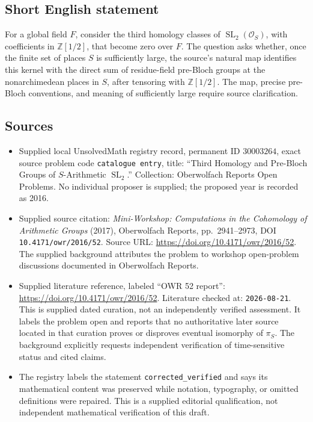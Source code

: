 \documentclass[11pt]{article}
\newcommand{\Z}{\mathbb{Z}}
\begin{document}
\subsection{Short English statement}
For a global field \(F\), consider the third homology classes of \(\operatorname{SL}_2(\mathcal O_S)\), with coefficients in \(\Z[1/2]\), that become zero over \(F\). The question asks whether, once the finite set of places \(S\) is sufficiently large, the source's natural map identifies this kernel with the direct sum of residue-field pre-Bloch groups at the nonarchimedean places in \(S\), after tensoring with \(\Z[1/2]\). The map, precise pre-Bloch conventions, and meaning of sufficiently large require source clarification.
\subsection{Sources}
\begin{itemize}
\item Supplied local UnsolvedMath registry record, permanent ID \(30003264\), exact source problem code \texttt{catalogue entry}, title: ``Third Homology and Pre-Bloch Groups of \(S\)-Arithmetic \(\operatorname{SL}_2\).'' Collection: Oberwolfach Reports Open Problems. No individual proposer is supplied; the proposed year is recorded as 2016.
\item Supplied source citation: \emph{Mini-Workshop: Computations in the Cohomology of Arithmetic Groups} (2017), Oberwolfach Reports, pp.\ 2941--2973, DOI \texttt{10.4171/owr/2016/52}. Source URL: \url{https://doi.org/10.4171/owr/2016/52}. The supplied background attributes the problem to workshop open-problem discussions documented in Oberwolfach Reports.
\item Supplied literature reference, labeled ``OWR 52 report'': \url{https://doi.org/10.4171/owr/2016/52}. Literature checked at: \texttt{2026-08-21}. This is supplied dated curation, not an independently verified assessment. It labels the problem open and reports that no authoritative later source located in that curation proves or disproves eventual isomorphy of \(\pi_S\). The background explicitly requests independent verification of time-sensitive status and cited claims.
\item The registry labels the statement \texttt{corrected\_verified} and says its mathematical content was preserved while notation, typography, or omitted definitions were repaired. This is a supplied editorial qualification, not independent mathematical verification of this draft.
\end{itemize}
\end{document}
